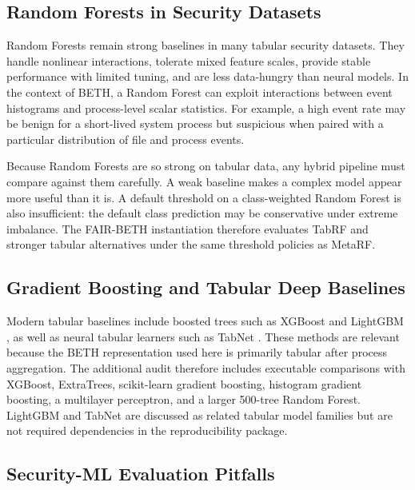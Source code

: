 \documentclass[10pt,journal,compsoc]{IEEEtran}
\begin{document}
\subsection{Random Forests in Security Datasets}

Random Forests \cite{breiman2001} remain strong baselines in many tabular security datasets. They handle nonlinear interactions, tolerate mixed feature scales, provide stable performance with limited tuning, and are less data-hungry than neural models. In the context of BETH, a Random Forest can exploit interactions between event histograms and process-level scalar statistics. For example, a high event rate may be benign for a short-lived system process but suspicious when paired with a particular distribution of file and process events.

Because Random Forests are so strong on tabular data, any hybrid pipeline must compare against them carefully. A weak baseline makes a complex model appear more useful than it is. A default threshold on a class-weighted Random Forest is also insufficient: the default class prediction may be conservative under extreme imbalance. The FAIR-BETH instantiation therefore evaluates TabRF and stronger tabular alternatives under the same threshold policies as MetaRF.

\subsection{Gradient Boosting and Tabular Deep Baselines}

Modern tabular baselines include boosted trees such as XGBoost \cite{chen2016xgboost} and LightGBM \cite{ke2017lightgbm}, as well as neural tabular learners such as TabNet \cite{arik2021tabnet}. These methods are relevant because the BETH representation used here is primarily tabular after process aggregation. The additional audit therefore includes executable comparisons with XGBoost, ExtraTrees, scikit-learn gradient boosting, histogram gradient boosting, a multilayer perceptron, and a larger 500-tree Random Forest. LightGBM and TabNet are discussed as related tabular model families but are not required dependencies in the reproducibility package.

\subsection{Security-ML Evaluation Pitfalls}
\end{document}
